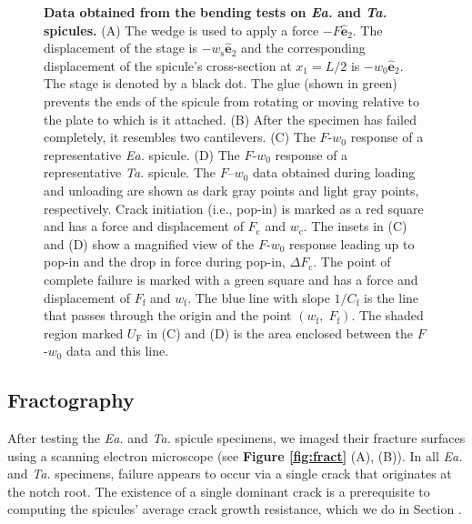 \documentclass[12pt,onecolumn]{article}
\makeatletter
\DeclareRobustCommand*{\nameref}[1]{%
      \emph{\myorg@nameref{#1}}%
    }%
\newcommand{\ey}{\hat{\mathbf{e}}_2}
\newcommand{\TA}{\textit{Ta.\@}\xspace}
\newcommand{\EA}{\textit{Ea.\@}\xspace}
\makeatother
\begin{document}
\begin{bibunit}
\begin{figure}[ht!]
			\caption{\textbf{Data obtained from the bending tests on \EA and \TA spicules.} (A) The wedge is used to apply a force $-F\ey$. The displacement of the stage is $-w_\mathrm{s}\ey$ and the corresponding displacement of the spicule's cross-section at $x_1=L/2$ is $-w_0\ey$. The stage is denoted by a black dot. The glue (shown in green) prevents the ends of the spicule from rotating or moving relative to the plate to which is it attached. (B) After the specimen has failed completely, it resembles two cantilevers. (C) The $F$-$w_0$ response of a representative \EA spicule. (D) The $F$-$w_0$ response of a representative \TA spicule. The $F$--$w_0$ data obtained during loading and unloading are shown as dark gray points and light gray points, respectively. Crack initiation (i.e., pop-in) is marked as a red square and has a force and displacement of $F_\mathrm{c}$ and $w_\mathrm{c}$. The insets in (C) and (D) show a magnified view of the $F$-$w_0$ response leading up to pop-in and the drop in force during pop-in, $\Delta F_\mathrm{c}$. The point of complete failure is marked with a green square and has a force and displacement of $F_\mathrm{f}$ and $w_\mathrm{f}$. The blue line with slope $1/C_\mathrm{f}$ is the line that passes through the origin and the point $(w_\mathrm{f},\; F_\mathrm{f})$. The shaded region marked $U_\mathrm{F}$ in (C) and (D) is the area enclosed between the $F$-$w_0$ data and this line.
			}
			\label{fig:test}
			\end{figure}
 			
			
\subsection*{Fractography}
\label{sec:fracto}
 After testing the \EA and \TA spicule specimens, we imaged their fracture surfaces using a scanning electron microscope (see {\bf Figure \ref{fig:fract}} (A), (B)). In all \EA and \TA specimens, failure appears to occur via a single crack that originates at the notch root. The existence of a single dominant crack is a prerequisite to computing the spicules' average crack growth resistance, which we do in Section \nameref{sec:avgR}. 
 

\end{bibunit}
\end{document}
